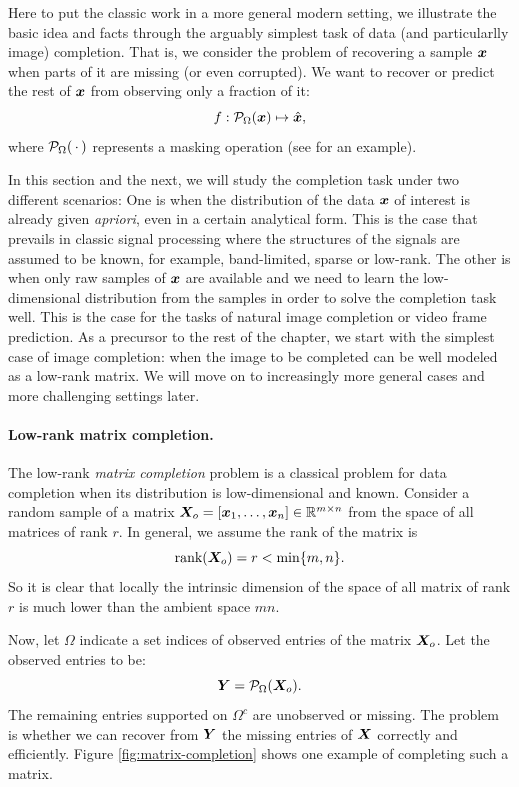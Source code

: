 \documentclass[../../book-main.tex]{subfiles}
\begin{document}
Here to put the classic work in a more general modern setting, we illustrate the basic idea and facts through the arguably simplest task of data (and particularlly image)  completion. That is, we consider the problem of recovering a sample $\bm{x}$ when parts of it are missing (or even corrupted). We want to recover or predict the rest of $\bm{x}$
from observing only a fraction of it:
\begin{equation}
f: \mathcal{P}_{\Omega}(\bm{x}) \mapsto \hat{\bm{x}},
\end{equation}
where $\mathcal{P}_{\Omega}(\,\cdot\,)$ represents a masking operation
(see  for an example).

In this section and the next, we will study the completion task under two different scenarios: One is when the distribution of the data $\bm{x}$ of interest is already given {\em apriori}, even in a certain analytical form. This is the case that prevails in classic signal processing where the structures of the signals are assumed to be known, for example,  band-limited, sparse or low-rank. The other is when only raw samples of $\bm{x}$ are available and we need to learn the low-dimensional distribution from the samples in order to solve the completion task well. This is the case for the tasks of natural image completion or video frame prediction. As a precursor to the rest of the chapter, we start with the simplest case of image completion: when the image to be completed can be well modeled as a low-rank matrix. We will move on to increasingly more general cases and more challenging settings later.

\paragraph{Low-rank matrix completion.}  
The low-rank {\em matrix
completion} problem is a classical problem for data completion when its distribution is low-dimensional and known. Consider a  random sample of a matrix $\bm{X}_o =
[\bm{x}_1, \ldots, \bm{x}_n] \in \mathbb{R}^{m\times n}$ from the space of all matrices of rank $r$. In general, we assume the rank
of the matrix is
\begin{equation}
\mbox{rank}(\bm{X}_o) = r < \min\{m, n\}.
\end{equation}
So it is clear that locally the intrinsic dimension of the space of all matrix of rank $r$ is much lower than the ambient space $mn$.

Now, let $\Omega$ indicate a set indices of observed entries of the matrix $\bm{X}_o$. Let the observed entries to be:
\begin{equation}
\bm{Y} = \mathcal{P}_{\Omega}(\bm{X}_o).
\end{equation}
The remaining entries supported on $\Omega^c$ are unobserved or
missing. The problem is whether we can recover from $\bm{Y}$ the missing
entries of $\bm{X}$ correctly and efficiently.  Figure \ref{fig:matrix-completion} shows one
example of completing such a matrix.
\end{document}
